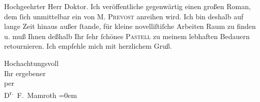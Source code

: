 \pstart{}Hochgeehrter Herr Doktor.\pend\vspace{0.5em}
\pstart
           Ich veröffentliche gegenwärtig einen großen Roman, dem{ }ſich unmittelbar ein \label{K_L00311-1v}\label{K_L00311-1} von \textsc{M. Prevost} anreihen wird. Ich bin deshalb auf lange Zeit hinaus außer{ }ſtande, für kleine
               novelliſtiſche Arbeiten Raum zu finden u. muß Ihnen deßhalb Ihr{ }ſehr{ }ſchönes \textsc{Pastell} zu meinem lebhaften Bedauern retournieren. Ich empfehle mich mit herzlichem
               Gruß.\pend
           
\pstart
           Hochachtungsvoll{\\[\baselineskip]}Ihr ergebener{\\[\baselineskip]}per{\\[\baselineskip]}\spacefill\mbox{D\textsuperscript{r.} F. Mamroth}\pend
           \leftskip=0em{}\endnumbering{}  \newcommand{\dateiname}{L00311}\newcommand{\titel}{Fedor Mamroth an Arthur Schnitzler, 4. 4. 1894}\newcommand{\editorInnen}{Martin Anton Müller und Gerd-Hermann Susen}
